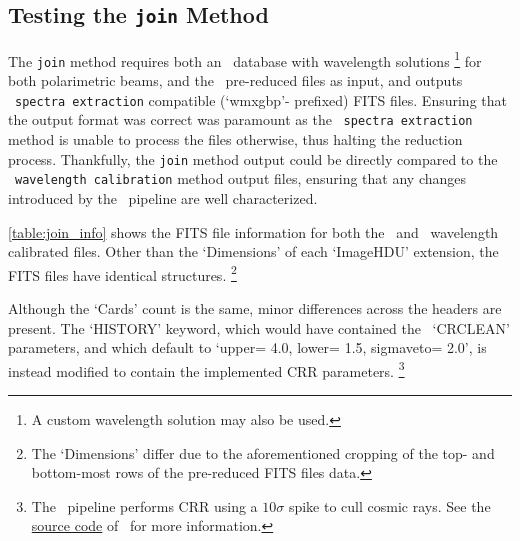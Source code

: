 \subsection[The \texttt{join} Method]{Testing the \texttt{join} Method} \label{subsec:test_join}

The \texttt{join} method requires both an \iraf\ database with wavelength solutions%
\footnote{A custom wavelength solution may also be used.}
for both polarimetric beams, and the \polsalt\ pre-reduced files as input,  and outputs \polsalt\ \texttt{spectra extraction} compatible (`wmxgbp'- prefixed) \gls{FITS} files.
Ensuring that the output format was correct was paramount as the \polsalt\ \texttt{spectra extraction} method is unable to process the files otherwise, thus halting the reduction process.
Thankfully, the \texttt{join} method output could be directly compared to the \polsalt\ \texttt{wavelength calibration} method output files, ensuring that any changes introduced by the \stops\ pipeline are well characterized.



\autoref{table:join_info} shows the \gls{FITS} file information for both the \polsalt\ and \stops\ wavelength calibrated files.
Other than the `Dimensions' of each `ImageHDU' extension, the \gls{FITS} files have identical structures.%
\footnote{The `Dimensions' differ due to the aforementioned cropping of the top- and bottom-most rows of the pre-reduced \gls{FITS} files data.}

Although the `Cards' count is the same, minor differences across the headers are present.
The `HISTORY' keyword, which would have contained the \polsalt\ `CRCLEAN' parameters, and which default to `upper= 4.0, lower= 1.5, sigmaveto= 2.0', is instead modified to contain the implemented \gls{CRR} parameters.%
\footnote{
    The \polsalt\ pipeline performs \gls{CRR} using a $10\sigma$ spike to cull cosmic rays.
    See the \protect\href{https://github.com/saltastro/polsalt/blob/master/polsalt/specpolwavmap.py\#L132}{source code} of \polsalt\ for more information.
}


